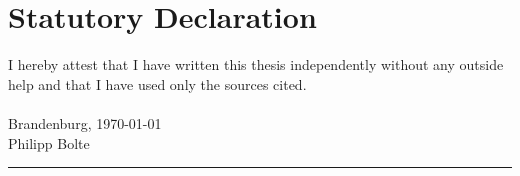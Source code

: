 
\usepackage[utf8]{inputenc}

\newcommand*{\mytitle}{Self-sovereign Identity: \\Development of an Implementation-based Evaluation Framework for Verifiable Credential SDKs} %
\newcommand*{\myinstitute}{Brandenburg University of Applied Sciences} %
\newcommand*{\myfaculty}{Department of Economics} %
\newcommand*{\myauthor}{Philipp Bolte} %
\newcommand*{\myreporttype}{Master's Thesis} %
\newcommand*{\mydate}{\today} %




	
\pagestyle{empty}

\newpage 					%
\thispagestyle{empty}
\quad 
\newpage
{}
 
\cleardoubleoddpage


\chapter*{Statutory Declaration}
I hereby attest that I have written this thesis independently without any outside help and that I have used only the sources cited. \\~\\
Brandenburg, \today\\[.6cm]
Philipp Bolte\\
\rule[0.5em]{20em}{0.5pt}



\tableofcontents			%
\listoffigures				%
\listoftables				%
\lstlistoflistings
